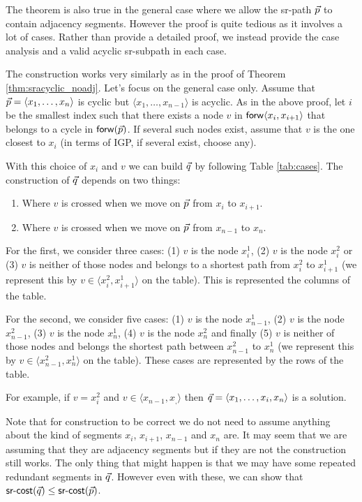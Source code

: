 The theorem is also true in the general case where we allow the sr-path $\vec{p}$ to contain adjacency segments. However the proof is
quite tedious as it involves a lot of cases. Rather than provide a detailed proof, we instead provide the case analysis and a valid
acyclic sr-subpath in each case.

The construction works very similarly as in the proof of Theorem \ref{thm:sracyclic_noadj}. Let's focus on the general case
only. Assume that $\vec{p} = \langle x_1, \ldots, x_n \rangle$ is cyclic but $\langle x_1, \ldots, x_{n - 1} \rangle$ is acyclic. 
As in the above proof, let $i$ be the smallest index such that
there exists a node $v$ in $\mathsf{forw} \langle x_i, x_{i + 1} \rangle$ that belongs to a cycle in $\mathsf{forw}(\vec{p})$.
If several such nodes exist, assume that $v$ is the one closest to $x_i$ (in terms of IGP, if several exist, choose any).

With this choice of $x_i$ and $v$ we can build $\vec{q}$ by following Table \ref{tab:cases}. The construction of $\vec{q}$ depends on
two things:

\begin{enumerate}
 \item Where $v$ is crossed when we move on $\vec{p}$ from $x_i$ to $x_{i + 1}$.
 \item Where $v$ is crossed when we move on $\vec{p}$ from $x_{n - 1}$ to $x_n$.
\end{enumerate}

For the first, we consider three cases: (1) $v$ is the node $x^1_i$, (2) $v$ is the node $x^2_{i}$ or (3) $v$ is neither
of those nodes and belongs to a shortest path from $x^2_i$ to $x^1_{i + 1}$ (we represent this by $v \in \langle x^2_i, x^1_{i + 1} \rangle$
on the table). This is represented the columns of the table.

For the second, we consider five cases: (1) $v$ is the node $x^1_{n - 1}$, (2) $v$ is the node $x^2_{n - 1}$, (3) $v$ is the node $x^1_n$, 
(4) $v$ is the node $x^2_n$ and finally (5) $v$ is neither of those nodes and belongs the shortest path between $x^2_{n - 1}$ to $x^1_n$ 
(we represent this by $v \in \langle x^2_{n - 1}, x^1_n\rangle$ on the table). These cases are represented by the rows of the table.

For example, if $v = x^2_i$ and $v \in \langle x_{n - 1}, x_, \rangle$ then $\vec{q} = \langle x_1, \ldots, x_i, x_n \rangle$ is a 
solution.

Note that for construction to be correct we do not need to assume anything about the kind of segments $x_i$, $x_{i + 1}$, $x_{n-1}$ and
$x_n$ are. It may seem that we are assuming that they are adjacency segments but if they are not the construction still works. The only
thing that might happen is that we may have some repeated redundant segments in $\vec{q}$. However even with these, we can show that 
$\textsf{sr-cost}(\vec{q}) \leq \textsf{sr-cost}(\vec{p})$.

